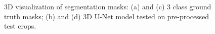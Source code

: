 \begin{figure}[!htb]
\centering
{}\hfil
{}

\hfil 
{}

\caption{3D visualization of segmentation masks: (a) and (c) 3 class ground truth masks; (b) and (d) \ac{3D} U-Net model tested on pre-processed test crops.}

\label{fig:results-unet-3channel}

\end{figure}


